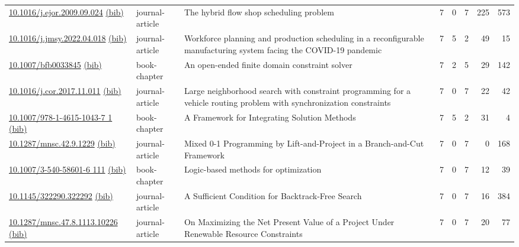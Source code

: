 {\begin{longtable}{p{5cm}lp{11cm}rrrrr}
\href{http://dx.doi.org/10.1016/j.ejor.2009.09.024}{10.1016/j.ejor.2009.09.024} \href{https://www.doi2bib.org/bib/10.1016/j.ejor.2009.09.024}{(bib)} & journal-article & The hybrid flow shop scheduling problem & 7 & 0 & 7 & 225 & 573 \\
\href{http://dx.doi.org/10.1016/j.jmsy.2022.04.018}{10.1016/j.jmsy.2022.04.018} \href{https://www.doi2bib.org/bib/10.1016/j.jmsy.2022.04.018}{(bib)} & journal-article & Workforce planning and production scheduling in a reconfigurable manufacturing system facing the COVID-19 pandemic & 7 & 5 & 2 & 49 & 15 \\
\href{http://dx.doi.org/10.1007/bfb0033845}{10.1007/bfb0033845} \href{https://www.doi2bib.org/bib/10.1007/bfb0033845}{(bib)} & book-chapter & An open-ended finite domain constraint solver & 7 & 2 & 5 & 29 & 142 \\
\href{http://dx.doi.org/10.1016/j.cor.2017.11.011}{10.1016/j.cor.2017.11.011} \href{https://www.doi2bib.org/bib/10.1016/j.cor.2017.11.011}{(bib)} & journal-article & Large neighborhood search with constraint programming for a vehicle routing problem with synchronization constraints & 7 & 0 & 7 & 22 & 42 \\
\href{http://dx.doi.org/10.1007/978-1-4615-1043-7_1}{10.1007/978-1-4615-1043-7 1} \href{https://www.doi2bib.org/bib/10.1007/978-1-4615-1043-7_1}{(bib)} & book-chapter & A Framework for Integrating Solution Methods & 7 & 5 & 2 & 31 & 4 \\
\href{http://dx.doi.org/10.1287/mnsc.42.9.1229}{10.1287/mnsc.42.9.1229} \href{https://www.doi2bib.org/bib/10.1287/mnsc.42.9.1229}{(bib)} & journal-article & Mixed 0-1 Programming by Lift-and-Project in a Branch-and-Cut Framework & 7 & 0 & 7 & 0 & 168 \\
\href{http://dx.doi.org/10.1007/3-540-58601-6_111}{10.1007/3-540-58601-6 111} \href{https://www.doi2bib.org/bib/10.1007/3-540-58601-6_111}{(bib)} & book-chapter & Logic-based methods for optimization & 7 & 0 & 7 & 12 & 39 \\
\href{http://dx.doi.org/10.1145/322290.322292}{10.1145/322290.322292} \href{https://www.doi2bib.org/bib/10.1145/322290.322292}{(bib)} & journal-article & A Sufficient Condition for Backtrack-Free Search & 7 & 0 & 7 & 16 & 384 \\
\href{http://dx.doi.org/10.1287/mnsc.47.8.1113.10226}{10.1287/mnsc.47.8.1113.10226} \href{https://www.doi2bib.org/bib/10.1287/mnsc.47.8.1113.10226}{(bib)} & journal-article & On Maximizing the Net Present Value of a Project Under Renewable Resource Constraints & 7 & 0 & 7 & 20 & 77 \\

\end{longtable}}
